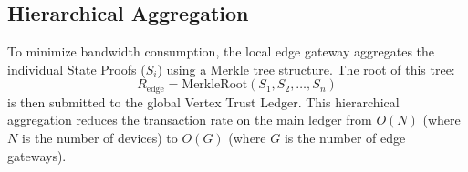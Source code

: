 \subsection{Hierarchical Aggregation}
To minimize bandwidth consumption, the local edge gateway aggregates the individual State Proofs ($S_i$) using a Merkle tree structure. The root of this tree:
\begin{equation}
    R_{\text{edge}} = \text{MerkleRoot}(S_1, S_2, \dots, S_n)
\end{equation}
is then submitted to the global Vertex Trust Ledger. This hierarchical aggregation reduces the transaction rate on the main ledger from $O(N)$ (where $N$ is the number of devices) to $O(G)$ (where $G$ is the number of edge gateways).
